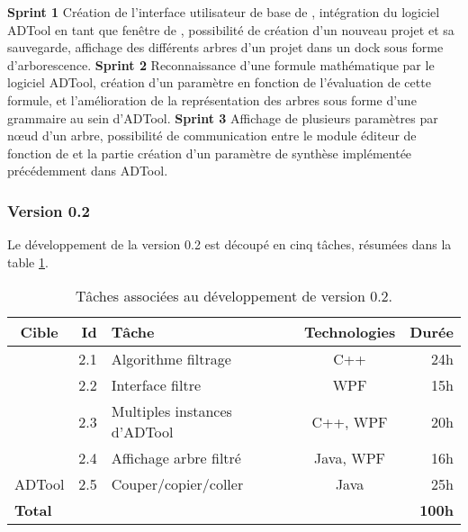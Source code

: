             \noindent\textbf{Sprint 1} Création de l'interface utilisateur de base de \glasir{}, intégration du logiciel ADTool en tant que fenêtre de \glasir{}, possibilité de création d'un nouveau projet et sa sauvegarde, affichage des différents arbres d'un projet dans un dock sous forme d'arborescence.\newline
            \textbf{Sprint 2} Reconnaissance d'une formule mathématique par le logiciel ADTool, création d'un paramètre en fonction de l'évaluation de cette formule, et l'amélioration de la représentation des arbres sous forme d'une grammaire au sein d'ADTool.\newline
            \textbf{Sprint 3} Affichage de plusieurs paramètres par nœud d'un arbre, possibilité de communication entre le module éditeur de fonction de \glasir{} et la partie création d'un paramètre de synthèse implémentée précédemment dans ADTool.\newline


        \subsubsection{Version 0.2}
            Le développement de la version 0.2 est découpé en cinq tâches, résumées dans la {\sc table} \ref{tab:taches_units_2}.
            \begin{table}[h]
                \centering
                \begin{tabular}{|c|r|l|c|r|}
                    \hline
                    \textbf{Cible} & \textbf{Id} & \textbf{Tâche} & \textbf{Technologies} & \textbf{Durée}\\
                    \hline

                    \multirow{4}{*}{\glasir{}} & 2.1 & Algorithme filtrage & C++ & 24h\\
                    \cline{2-5}
                     & 2.2 & Interface filtre & WPF & 15h\\
                    \cline{2-5}
                     & 2.3 & Multiples instances d'ADTool & C++, WPF & 20h\\
                    \cline{2-5}
                     & 2.4 & Affichage arbre filtré & Java, WPF & 16h\\
                    \hline

                    \multirow{1}{*}{ADTool} & 2.5 & Couper/copier/coller & \multirow{1}{*}{Java} & 25h\\
                    \hline

                    \multicolumn{4}{|l|}{\bf Total} & {\bf 100h}\\
                    \hline
                \end{tabular}
                \caption{Tâches associées au développement de \glasir{} version 0.2.}
                \label{tab:taches_units_2}
            \end{table}
            
